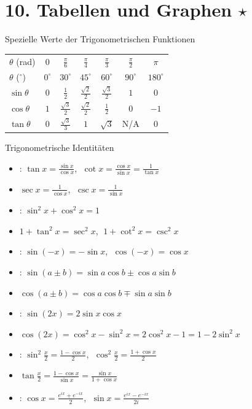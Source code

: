 \section{10. Tabellen und Graphen \texorpdfstring{$\star$}{*}}

\begin{minipage}{\linewidth}
\Tab Spezielle Werte der Trigonometrischen Funktionen

\begin{tabular}{l | c c c c c c}
    $\theta$ (rad) & $0$ & $\frac{\pi}{6}$ & $\frac{\pi}{4}$ & $\frac{\pi}{3}$ & $\frac{\pi}{2}$ & $\pi$ \\[1ex]
    $\theta$ ($^\circ$) & $0^\circ$ & $30^\circ$ & $45^\circ$ & $60^\circ$ & $90^\circ$ & $180^\circ$ \\[0.5ex]
    \hline
    $\sin\theta$ & $0$ & $\frac{1}{2}$ & $\frac{\sqrt{2}}{2}$ & $\frac{\sqrt{3}}{2}$ & $1$ & $0$ \\[1ex]
    $\cos\theta$ & $1$ & $\frac{\sqrt{3}}{2}$ & $\frac{\sqrt{2}}{2}$ & $\frac{1}{2}$ & $0$ & $-1$ \\[1ex]
    $\tan\theta$ & $0$ & $\frac{\sqrt{3}}{3}$ & $1$ & $\sqrt{3}$ & N/A & $0$
\end{tabular}
\end{minipage}

\begin{minipage}{\linewidth}
\Tab Trigonometrische Identitäten
\begin{itemize}
    \item {}: $\tan x = \frac{\sin x}{\cos x}$, $\;\cot x = \frac{\cos x}{\sin x} = \frac{1}{\tan x}$
    \item $\sec x = \frac{1}{\cos x}$, $\;\csc x = \frac{1}{\sin x}$
    \item {}: $\sin^2x + \cos^2x = 1$
    \item $1+\tan^2x=\sec^2x$, $\;1+\cot^2x=\csc^2x$
    \item {}: $\sin(-x)=-\sin x$, $\;\cos(-x)=\cos x$
    \item {}: $\sin(a\pm b)=\sin a\cos b\pm\cos a\sin b$
    \item $\cos(a\pm b)=\cos a\cos b\mp\sin a\sin b$
    \item {}: $\sin(2x)=2\sin x\cos x$
    \item $\cos(2x)=\cos^2x-\sin^2x=2\cos^2x-1=1-2\sin^2x$
    \item {}: $\sin^2\frac{x}{2}=\frac{1-\cos x}{2}$, $\;\cos^2\frac{x}{2}=\frac{1+\cos x}{2}$
    \item $\tan\frac{x}{2}=\frac{1-\cos x}{\sin x}=\frac{\sin x}{1+\cos x}$
    \item {}: $\cos x=\frac{e^{ix}+e^{-ix}}{2}$, $\;\sin x=\frac{e^{ix}-e^{-ix}}{2i}$
\end{itemize}
\end{minipage}

